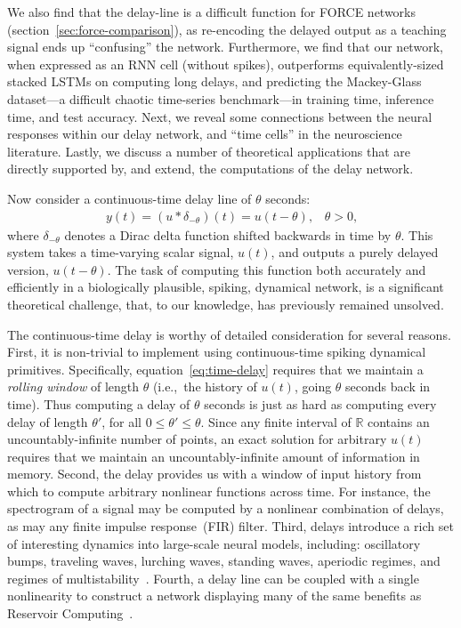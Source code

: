 We also find that the delay-line is a difficult function for FORCE networks (section~\ref{sec:force-comparison}), as re-encoding the delayed output as a teaching signal ends up ``confusing'' the network.
Furthermore, we find that our network, when expressed as an RNN cell (without spikes), outperforms equivalently-sized stacked LSTMs on computing long delays, and predicting the Mackey-Glass dataset---a difficult chaotic time-series benchmark---in training time, inference time, and test accuracy.
Next, we reveal some connections between the neural responses within our delay network, and ``time cells'' in the neuroscience literature.
Lastly, we discuss a number of theoretical applications that are directly supported by, and extend, the computations of the delay network.

Now consider a continuous-time delay line of $\theta$ seconds:
\begin{align} \label{eq:time-delay}
y(t) = (u \ast \delta_{-\theta})(t) = u(t - \theta)\text{,} \quad \theta > 0 \text{,}
\end{align}
where $\delta_{-\theta}$ denotes a Dirac delta function shifted backwards in time by $\theta$.
This system takes a time-varying scalar signal, $u(t)$, and outputs a purely delayed version, $u(t - \theta)$.
The task of computing this function both accurately and efficiently in a biologically plausible, spiking, dynamical network, is a significant theoretical challenge, that, to our knowledge, has previously remained unsolved.

The continuous-time delay is worthy of detailed consideration for several reasons.
First, it is non-trivial to implement using continuous-time spiking dynamical primitives.
Specifically, equation~\ref{eq:time-delay} requires that we maintain a \emph{rolling window} of length $\theta$ (i.e.,~the history of $u(t)$, going $\theta$ seconds back in time).
Thus computing a delay of $\theta$ seconds is just as hard as computing every delay of length $\theta'$, for all $0 \le \theta' \le \theta$.
Since any finite interval of $\mathbb{R}$ contains an uncountably-infinite number of points, an exact solution for arbitrary $u(t)$ requires that we maintain an uncountably-infinite amount of information in memory.
Second, the delay provides us with a window of input history from which to compute arbitrary nonlinear functions across time.
For instance, the spectrogram of a signal may be computed by a nonlinear combination of delays, as may any finite impulse response~(FIR) filter.
Third, delays introduce a rich set of interesting dynamics into large-scale neural models, including: oscillatory bumps, traveling waves, lurching waves, standing waves, aperiodic regimes, and regimes of multistability~\citep{roxin2005role}.
Fourth, a delay line can be coupled with a single nonlinearity to construct a network displaying many of the same benefits as Reservoir Computing~\citep{appeltant2011information, bai2018dfr}.


